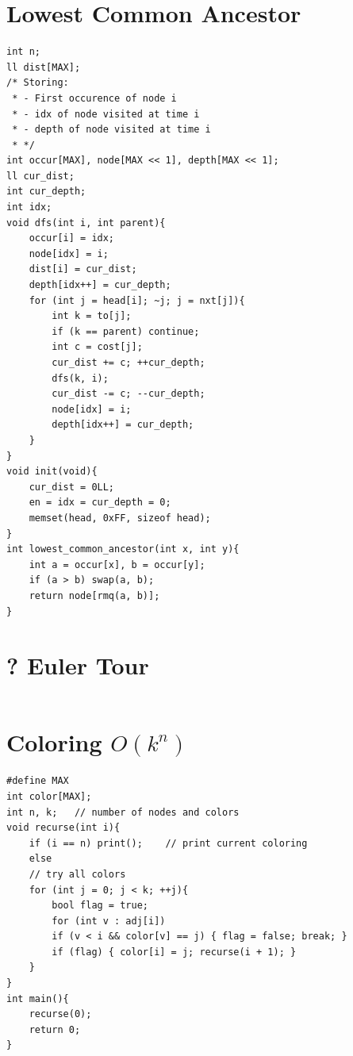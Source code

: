 \documentclass[12pt]{book}
\begin{document}
\section{Lowest Common Ancestor}
\begin{verbatim}
int n;
ll dist[MAX];
/* Storing:
 * - First occurence of node i
 * - idx of node visited at time i
 * - depth of node visited at time i
 * */
int occur[MAX], node[MAX << 1], depth[MAX << 1];
ll cur_dist;
int cur_depth;
int idx;
void dfs(int i, int parent){
	occur[i] = idx;
	node[idx] = i;
	dist[i] = cur_dist;
	depth[idx++] = cur_depth;
	for (int j = head[i]; ~j; j = nxt[j]){
		int k = to[j];
		if (k == parent) continue;
		int c = cost[j];
		cur_dist += c; ++cur_depth;
		dfs(k, i);
		cur_dist -= c; --cur_depth;
		node[idx] = i;
		depth[idx++] = cur_depth;
	}
}
void init(void){
	cur_dist = 0LL;
	en = idx = cur_depth = 0;
	memset(head, 0xFF, sizeof head);
}
int lowest_common_ancestor(int x, int y){
	int a = occur[x], b = occur[y];
	if (a > b) swap(a, b);
	return node[rmq(a, b)];
}
\end{verbatim}
\section{? Euler Tour}
\begin{verbatim}
\end{verbatim}
\section{Coloring $O(k^n)$}
\begin{verbatim}
#define MAX
int color[MAX];
int n, k;	// number of nodes and colors
void recurse(int i){
	if (i == n) print();	// print current coloring
	else
	// try all colors
	for (int j = 0; j < k; ++j){
		bool flag = true;
		for (int v : adj[i])
		if (v < i && color[v] == j) { flag = false; break; }
		if (flag) { color[i] = j; recurse(i + 1); }
	}
}
int main(){
	recurse(0);
	return 0;
}
\end{verbatim}
\end{document}

